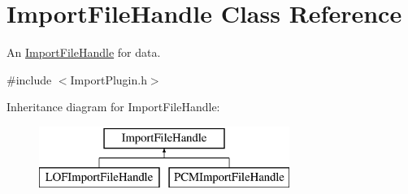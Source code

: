 \hypertarget{class_import_file_handle}{}\section{Import\+File\+Handle Class Reference}
\label{class_import_file_handle}


An \hyperlink{class_import_file_handle}{Import\+File\+Handle} for data.  




{\ttfamily \#include $<$Import\+Plugin.\+h$>$}

Inheritance diagram for Import\+File\+Handle\+:\begin{figure}[H]
\begin{center}
\leavevmode
\includegraphics[height=2.000000cm]{class_import_file_handle}
\end{center}
\end{figure}

